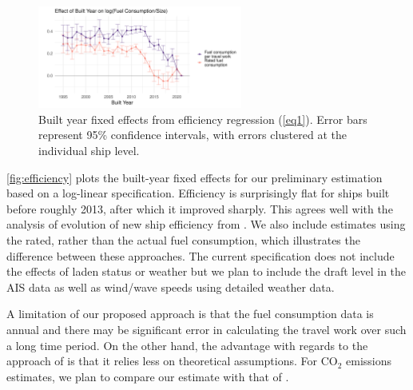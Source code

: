 \documentclass[hidelinks, 12pt,letterpaper]{article}
\begin{document}
 \begin{figure}[h]
  \centering 
  \includegraphics[width = 0.6\textwidth]{Efficiency_Regression_Size_Built_coefs_1and3_ggplot.png}
  \caption{Built year fixed effects from efficiency regression (\ref{eq1}). Error bars represent 95\% confidence intervals, with errors clustered at the individual ship level.}
  \label{fig:efficiency}
\end{figure} 

 \autoref{fig:efficiency} plots the built-year fixed effects for our preliminary estimation based on a log-linear specification. Efficiency is surprisingly flat for ships built before roughly 2013, after which it improved sharply. This agrees well with the analysis of evolution of new ship efficiency from \citet[][Figure 15]{faber2015historical}. We also include estimates using the rated, rather than the actual fuel consumption, which illustrates the difference between these approaches. The current specification does not include the effects of laden status or weather but we plan to include the draft level in the AIS data as well as wind/wave speeds using detailed weather data. %



A limitation of our proposed approach is that the fuel consumption data is annual and there may be significant error in calculating the travel work over such a long time period. On the other hand, the advantage with regards to the approach of \citet{faber2020fourth} is that it relies less on theoretical assumptions. For CO$_2$ emissions estimates, we plan to compare our estimate with that of \citet{faber2020fourth}. %
\end{document}

